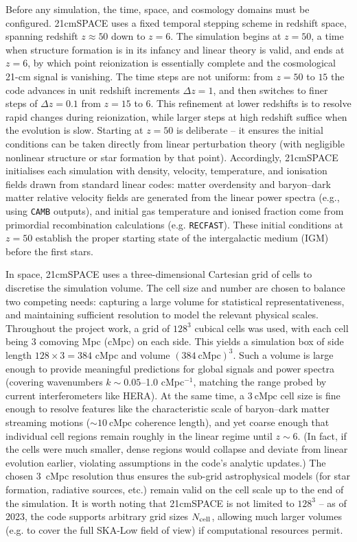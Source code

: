 \documentclass[floats,floatfix,showpacs,amssymb,prd,superscriptaddress,nofootinbib]{revtex4-2} %
\newcommand{\code}{\texttt}
\begin{document}
Before any simulation, the time, space, and cosmology domains must be configured. 21cmSPACE uses a fixed temporal stepping scheme in redshift space, spanning redshift $z\approx50$ down to $z=6$. The simulation begins at $z=50$, a time when structure formation is in its infancy and linear theory is valid, and ends at $z=6$, by which point reionization is essentially complete and the cosmological 21-cm signal is vanishing. The time steps are not uniform: from $z=50$ to $15$ the code advances in unit redshift increments $\Delta z=1$, and then switches to finer steps of $\Delta z=0.1$ from $z=15$ to $6$. This refinement at lower redshifts is to resolve rapid changes during reionization, while larger steps at high redshift suffice when the evolution is slow. Starting at $z=50$ is deliberate – it ensures the initial conditions can be taken directly from linear perturbation theory (with negligible nonlinear structure or star formation by that point). Accordingly, 21cmSPACE initialises each simulation with density, velocity, temperature, and ionisation fields drawn from standard linear codes: matter overdensity and baryon–dark matter relative velocity fields are generated from the linear power spectra (e.g., using \code{CAMB} outputs), and initial gas temperature and ionised fraction come from primordial recombination calculations (e.g. \code{RECFAST}). These initial conditions at $z=50$ establish the proper starting state of the intergalactic medium (IGM) before the first stars.

In space, 21cmSPACE uses a three-dimensional Cartesian grid of cells to discretise the simulation volume. The cell size and number are chosen to balance two competing needs: capturing a large volume for statistical representativeness, and maintaining sufficient resolution to model the relevant physical scales. Throughout the project work, a grid of $128^3$ cubical cells was used, with each cell being 3 comoving Mpc (cMpc) on each side. This yields a simulation box of side length $128\times3 = 384$ cMpc and volume $(384~\text{cMpc})^3$. Such a volume is large enough to provide meaningful predictions for global signals and power spectra (covering wavenumbers $k \sim 0.05$–1.0 cMpc$^{-1}$, matching the range probed by current interferometers like HERA). At the same time, a $3~\text{cMpc}$ cell size is fine enough to resolve features like the characteristic scale of baryon–dark matter streaming motions ($\sim 10~\text{cMpc}$ coherence length), and yet coarse enough that individual cell regions remain roughly in the linear regime until $z\sim6$. (In fact, if the cells were much smaller, dense regions would collapse and deviate from linear evolution earlier, violating assumptions in the code’s analytic updates.) The chosen 3 cMpc resolution thus ensures the sub-grid astrophysical models (for star formation, radiative sources, etc.) remain valid on the cell scale up to the end of the simulation. It is worth noting that 21cmSPACE is not limited to $128^3$ – as of 2023, the code supports arbitrary grid sizes $N_{\rm cell}$, allowing much larger volumes (e.g. to cover the full SKA-Low field of view) if computational resources permit.
\end{document}
